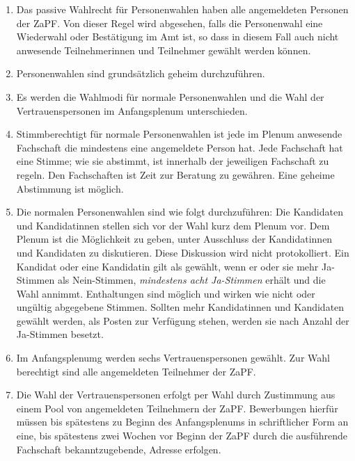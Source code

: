 \documentclass[draft,12pt,oneside]{scrreprt}
\begin{document}
\begin{enumerate}
\item Das passive Wahlrecht für Personenwahlen haben alle angemeldeten Personen
      der ZaPF. Von dieser Regel wird abgesehen, falls die Personenwahl eine
      Wiederwahl oder Bestätigung im Amt ist, so dass in diesem Fall auch nicht
      anwesende Teilnehmerinnen und Teilnehmer gewählt werden können.

\item Personenwahlen sind grundsätzlich geheim durchzuführen.

\item Es werden die Wahlmodi für normale Personenwahlen und die Wahl der
      Vertrauenspersonen im Anfangsplenum unterschieden.

\item Stimmberechtigt für normale Personenwahlen ist jede im Plenum anwesende
      Fachschaft die mindestens eine angemeldete Person hat.
      Jede Fachschaft hat eine Stimme; wie sie abstimmt, ist innerhalb der
      jeweiligen Fachschaft zu regeln.
      Den Fachschaften ist Zeit zur Beratung zu gewähren.
      Eine geheime Abstimmung ist möglich.

\item Die normalen Personenwahlen sind wie folgt durchzuführen:
      Die Kandidaten und Kandidatinnen stellen sich vor der Wahl kurz dem
      Plenum vor.
      Dem Plenum ist die Möglichkeit zu geben, unter Ausschluss der Kandidatinnen
      und Kandidaten zu diskutieren.
      Diese Diskussion wird nicht protokolliert.
      Ein Kandidat oder eine Kandidatin gilt als gewählt, wenn er oder sie mehr
      Ja-Stimmen als Nein-Stimmen, \textit{mindestens acht Ja-Stimmen}
      erhält und die Wahl annimmt.
      Enthaltungen sind möglich und wirken wie nicht oder ungültig abgegebene
      Stimmen.
      Sollten mehr Kandidatinnen und Kandidaten gewählt werden, als Posten zur
      Verfügung stehen, werden sie nach Anzahl der Ja-Stimmen besetzt.

\item Im Anfangsplenumg werden sechs Vertrauenspersonen gewählt. Zur Wahl
      berechtigt sind alle angemeldeten Teilnehmer der ZaPF.

\item Die Wahl der Vertrauenspersonen erfolgt per Wahl durch
      Zustimmung aus einem Pool von angemeldeten Teilnehmern der ZaPF.
      Bewerbungen hierfür müssen bis spätestens zu Beginn des Anfangsplenums
      in schriftlicher Form an eine, bis spätestens zwei Wochen vor Beginn der
      ZaPF durch die ausführende Fachschaft bekanntzugebende, Adresse erfolgen.


\end{enumerate}
\end{document}
